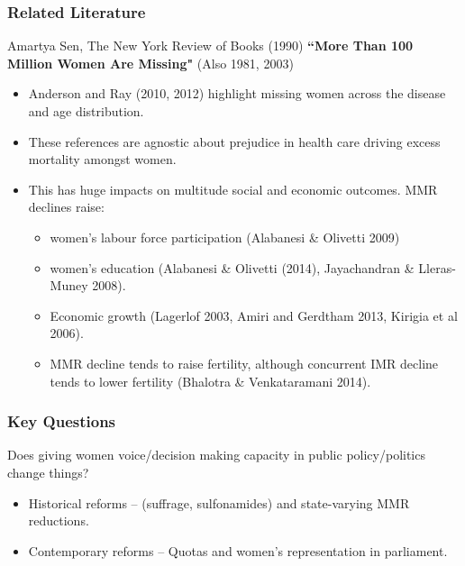 \documentclass[10pt,letterpaper,subeqn]{beamer}
\begin{document}
\begin{frame}
\frametitle{Related Literature}
Amartya Sen, The New York Review of Books (1990) \textbf{``More Than 100 Million Women Are Missing"} (Also 1981, 2003) \vspace{4mm}
\begin{itemize}
\item Anderson and Ray (2010, 2012) highlight missing women across the disease and age distribution.
\item These references are agnostic about prejudice in health care driving excess mortality amongst women.
\item This has huge impacts on multitude social and economic outcomes.  MMR declines raise:
  \begin{itemize}
  \item women's labour force participation (Alabanesi \& Olivetti 2009) 
  \item women's education (Alabanesi \& Olivetti (2014), Jayachandran \& Lleras-Muney 2008).
  \item Economic growth (Lagerlof 2003, Amiri and Gerdtham 2013, Kirigia et al 2006).
  \item MMR decline tends to raise fertility, although concurrent IMR decline tends to lower fertility (Bhalotra \& Venkataramani 2014).
  \end{itemize}
\end{itemize}
\end{frame}


\begin{frame}
\frametitle{Key Questions}
Does giving women voice/decision making capacity in public policy/politics change things? 
\vspace{4.5mm}
\begin{itemize}
  \setlength{\itemsep}{9.5pt}
	\item Historical reforms -- (suffrage, sulfonamides) and state-varying MMR reductions.
  \item Contemporary reforms -- Quotas and women's representation in parliament.
\end{itemize}
\end{frame}
\end{document}
